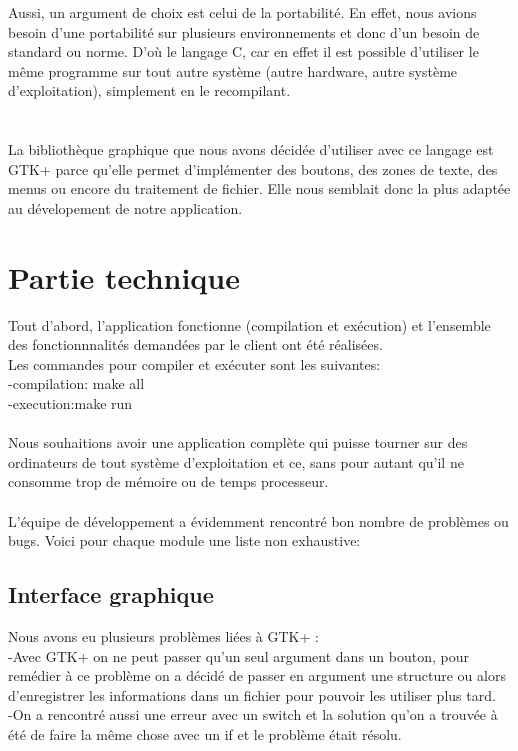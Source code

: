 \documentclass[a4]{article}
\begin{document}
  Aussi, un argument de choix est celui de la portabilité. En effet, nous avions besoin d'une portabilité sur plusieurs
  environnements et donc d'un besoin de standard ou norme. D'où le langage C, car en effet il est possible d'utiliser
  le même programme sur tout autre système (autre hardware, autre système d'exploitation), simplement en le recompilant. \\ \\ \\
  

La bibliothèque graphique que nous avons décidée d'utiliser avec ce langage est GTK+ parce qu'elle permet d'implémenter 
des boutons, des zones de texte, des menus ou encore du traitement de fichier.
Elle nous semblait donc la plus adaptée au dévelopement de notre application.

	\section{Partie technique}
	
	Tout d'abord, l'application fonctionne (compilation et exécution) et
	l'ensemble des fonctionnnalités demandées par le client ont été réalisées.\\ 
	Les commandes pour compiler et exécuter sont les suivantes:\\
	-compilation: make all\\
	-execution:make run\\ \\
	
	
	Nous souhaitions avoir une application complète qui puisse tourner sur des ordinateurs 
de tout système d'exploitation et ce, sans pour autant qu’il ne
consomme trop de mémoire ou de temps processeur. \\ \\
	
	L'équipe de développement a évidemment rencontré bon nombre de problèmes ou bugs. Voici pour chaque
	module une liste non exhaustive:
	\subsection{Interface graphique}
	Nous avons eu plusieurs problèmes liées à GTK+ :\\
	-Avec GTK+ on ne peut passer qu'un seul argument dans un bouton, 
	pour remédier à ce problème on a décidé de passer en argument une structure ou alors d'enregistrer les informations 
  dans un fichier pour pouvoir les utiliser plus tard.\\
	-On a rencontré aussi une erreur avec un switch et la solution qu'on a trouvée à été de faire 
	la même chose avec un if et le problème était résolu.\\
	
\end{document}

